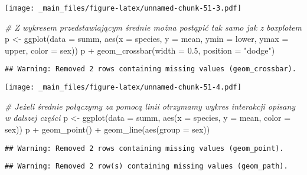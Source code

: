 \documentclass[
]{book}
\newenvironment{Shaded}{\begin{snugshade}}{\end{snugshade}}
\newcommand{\AttributeTok}[1]{\textcolor[rgb]{0.77,0.63,0.00}{#1}}
\newcommand{\CommentTok}[1]{\textcolor[rgb]{0.56,0.35,0.01}{\textit{#1}}}
\newcommand{\FloatTok}[1]{\textcolor[rgb]{0.00,0.00,0.81}{#1}}
\newcommand{\FunctionTok}[1]{\textcolor[rgb]{0.00,0.00,0.00}{#1}}
\newcommand{\NormalTok}[1]{#1}
\newcommand{\OtherTok}[1]{\textcolor[rgb]{0.56,0.35,0.01}{#1}}
\newcommand{\SpecialCharTok}[1]{\textcolor[rgb]{0.00,0.00,0.00}{#1}}
\newcommand{\StringTok}[1]{\textcolor[rgb]{0.31,0.60,0.02}{#1}}
\begin{document}
\texttt{[image: \_main\_files/figure-latex/unnamed-chunk-51-3.pdf]}

\begin{Shaded}
\begin{Highlighting}[]
\CommentTok{\# Z wykresem przedstawiającym średnie można postąpić tak samo jak z boxplotem}
\NormalTok{p }\OtherTok{\textless{}{-}} \FunctionTok{ggplot}\NormalTok{(}\AttributeTok{data =}\NormalTok{ summ, }\FunctionTok{aes}\NormalTok{(}\AttributeTok{x =}\NormalTok{ species, }\AttributeTok{y =}\NormalTok{ mean, }\AttributeTok{ymin =}\NormalTok{ lower, }\AttributeTok{ymax =}\NormalTok{ upper, }
                             \AttributeTok{color =}\NormalTok{ sex))}
\NormalTok{p }\SpecialCharTok{+} \FunctionTok{geom\_crossbar}\NormalTok{(}\AttributeTok{width =} \FloatTok{0.5}\NormalTok{, }\AttributeTok{position =} \StringTok{"dodge"}\NormalTok{)}
\end{Highlighting}
\end{Shaded}

\begin{verbatim}
## Warning: Removed 2 rows containing missing values (geom_crossbar).
\end{verbatim}

\texttt{[image: \_main\_files/figure-latex/unnamed-chunk-51-4.pdf]}

\begin{Shaded}
\begin{Highlighting}[]
\CommentTok{\# Jeżeli średnie połączymy za pomocą linii otrzymamy wykres interakcji opisany w dalszej części}
\NormalTok{p }\OtherTok{\textless{}{-}} \FunctionTok{ggplot}\NormalTok{(}\AttributeTok{data =}\NormalTok{ summ, }\FunctionTok{aes}\NormalTok{(}\AttributeTok{x =}\NormalTok{ species, }\AttributeTok{y =}\NormalTok{ mean, }\AttributeTok{color =}\NormalTok{ sex))}
\NormalTok{p }\SpecialCharTok{+} \FunctionTok{geom\_point}\NormalTok{() }\SpecialCharTok{+} \FunctionTok{geom\_line}\NormalTok{(}\FunctionTok{aes}\NormalTok{(}\AttributeTok{group =}\NormalTok{ sex))}
\end{Highlighting}
\end{Shaded}

\begin{verbatim}
## Warning: Removed 2 rows containing missing values (geom_point).
\end{verbatim}

\begin{verbatim}
## Warning: Removed 2 row(s) containing missing values (geom_path).
\end{verbatim}
\end{document}
